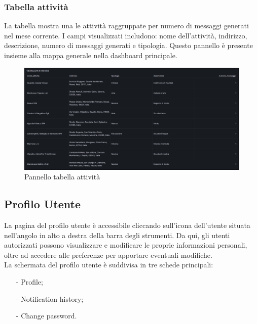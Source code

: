 \documentclass[10pt]{article}
\begin{document}
\begin{justify}
    \subsubsection{Tabella attività}
    La tabella mostra una le attività raggruppate per numero di messaggi generati nel mese corrente. I campi visualizzati includono: nome dell'attività, indirizzo, descrizione, numero di messaggi generati e tipologia. Questo pannello è presente insieme alla mappa generale nella dashboard principale.
    \begin{figure}[H]
    \centering
    \includegraphics[width=1\linewidth]{tabella.png}
    \caption{Pannello tabella attività}
    \end{figure}



\subsection{Profilo Utente}
La pagina del profilo utente è accessibile cliccando sull'icona dell'utente situata nell'angolo in alto a destra della barra degli strumenti. Da qui, gli utenti autorizzati possono visualizzare e modificare le proprie informazioni personali, oltre ad accedere alle preferenze per apportare eventuali modifiche.\\
La schermata del profilo utente è suddivisa in tre schede principali:  
\begin{itemize}  
    \item[-] Profile; 
    \item[-] Notification history; 
    \item[-] Change password.  
\end{itemize}
    

\end{justify}
\end{document}
